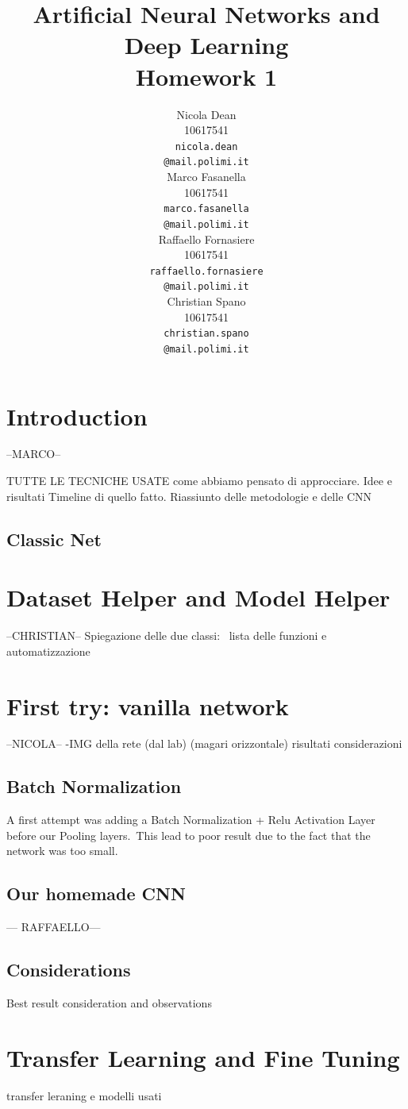 \documentclass[10pt]{article}
\title{Artificial Neural Networks and Deep Learning \\
Homework 1}
\author{
  Nicola Dean \\
  10617541 \\
  {\tt nicola.dean \\
  \tt @mail.polimi.it} \\\And
  Marco Fasanella \\
  10617541 \\
  {\tt marco.fasanella \\
  \tt @mail.polimi.it} \\\And
  Raffaello Fornasiere \\
    10617541 \\
    {\tt raffaello.fornasiere \\
    \tt @mail.polimi.it} \\\And
  Christian Spano \\
  10617541 \\
  {\tt christian.spano \\
  \tt @mail.polimi.it} \\}
\date{}
\begin{document}
\maketitle



\section{Introduction}
--MARCO--

TUTTE LE TECNICHE USATE
come abbiamo pensato di approcciare.
Idee e risultati
Timeline di quello fatto.
Riassiunto delle metodologie e delle CNN
\subsection{Classic Net}


\section{Dataset Helper and Model Helper}
--CHRISTIAN--
Spiegazione delle due classi: \
lista delle funzioni e automatizzazione

\section{First try: vanilla network}
--NICOLA--
-IMG della rete (dal lab) (magari orizzontale)
risultati
considerazioni
\subsection{Batch Normalization}
A first attempt was adding a Batch Normalization + Relu Activation Layer before our Pooling layers.\
This lead to poor result due to the fact that the network was too small.
\subsection{Our homemade CNN}
--- RAFFAELLO---
\subsection{Considerations}
Best result consideration and observations
\section{Transfer Learning and Fine Tuning}
transfer leraning e modelli usati
\end{document}
